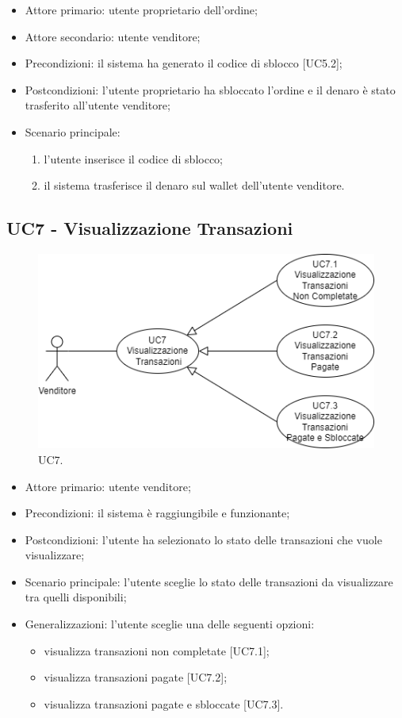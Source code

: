 \begin{itemize}
    \item Attore primario: utente proprietario dell'ordine;
    \item Attore secondario: utente venditore;
    \item Precondizioni: il sistema ha generato il codice di sblocco [UC5.2];
    \item Postcondizioni: l'utente proprietario ha sbloccato l'ordine e il denaro è stato trasferito all'utente venditore;
    \item Scenario principale:
    \begin{enumerate}
        \item l'utente inserisce il codice di sblocco;
        \item il sistema trasferisce il denaro sul wallet dell'utente venditore.
    \end{enumerate}
\end{itemize}

\subsection{UC7 - Visualizzazione Transazioni}

\begin{figure}[H]
    \centering
    \includegraphics[scale=0.7]{immagini/UseCases-UC7.png}
    \caption{UC7.}
  \end{figure}

\begin{itemize}
    \item Attore primario: utente venditore;
    \item Precondizioni: il sistema è raggiungibile e funzionante;
    \item Postcondizioni: l'utente ha selezionato lo stato delle transazioni che vuole visualizzare;
    \item Scenario principale: l'utente sceglie lo stato delle transazioni da visualizzare tra quelli disponibili;
    \item Generalizzazioni: l'utente sceglie una delle seguenti opzioni:
    \begin{itemize}
        \item visualizza transazioni non completate [UC7.1];
        \item visualizza transazioni pagate [UC7.2];
        \item visualizza transazioni pagate e sbloccate [UC7.3].
    \end{itemize}
\end{itemize}

